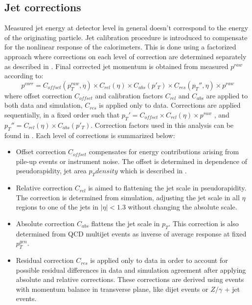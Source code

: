 
\subsection{Jet corrections}

Measured jet energy at detector level in general doesn't correspond to the energy of the originating particle. Jet calibration procedure is introduced to compensate for the nonlinear response of the calorimeters. This is done using a factorized approach where corrections on each level of correction are determined separately as described in \cite{Chatrchyan:2011ds}. Final corrected jet momentum is obtained from measured $p^{raw}$ according to:
\begin{equation}
p^{corr} = C_{offset}(p_T^{raw},\eta)\times C_{rel}(\eta) \times C_{abs}(p'_T) \times C_{res}(p_T'',\eta) \times p^{raw}
\end{equation}     
where offset correction $C_{offset}$ and calibration factors $C_{rel}$ and $C_{abs}$ are applied to both data and simulation, $C_{res}$ is applied only to data. Corrections are applied sequentially, in a fixed order such that $p_T' = C_{offset} \times C_{rel}(\eta) \times p^{raw}$ , and $p_T'' = C_{rel}(\eta) \times C_{abs}(p'_T)$. Correction factors used in this analysis can be found in \cite{CMS-DP-2013-033}.
Each level of corrections is summarized below:
\begin{itemize}
\item Offset correction $C_{offset}$ compensates for energy contributions arising from pile-up events or instrument noise. The offset is determined in dependence of pseudorapidity, jet area $p_T density$ which is described in \cite{Cacciari2008119}.
\item Relative correction $C_{rel}$ is aimed to flattening the jet scale in pseudorapidity. The correction is determined from simulation, adjusting the jet scale in all $\eta$ regions to one of the jets in $|\eta|<1.3$ without changing the absolute scale.
\item Absolute correction $C_{abs}$ flattens the jet scale in $p_T$. This correction is also determined from QCD multijet events as inverse of average response at fixed $p_T^{gen}$.
\item Residual correction $C_{res}$ is applied only to data in order to account for possible residual differences in data and simulation agreement after applying absolute and relative corrections. These corrections are derived using events with momentum balance in transverse plane, like dijet events or $Z/\gamma$ + jet events.
\end{itemize}
